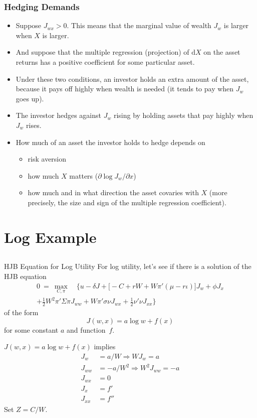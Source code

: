 \documentclass[10pt]{beamer}
\newcommand{\bi}{\begin{itemize}}
\newcommand{\ei}{\end{itemize}}
\newcommand{\im}{\item}
\newcommand{\D}{\mathrm{d}}
\newcommand{\bfr}{\begin{frame}}
\begin{document}
\bfr\frametitle{Hedging Demands}
\bi
\im Suppose $J_{wx}>0$.  This means that the marginal value of wealth $J_w$ is larger when $X$ is larger.
\im And suppose that the multiple regression (projection) of $\D X$ on the asset returns has a positive coefficient for some particular asset.  
\im Under these two conditions, an investor holds an extra amount of the asset, because it pays off highly when wealth is needed (it tends to pay when $J_w$ goes up).
\im The investor hedges against $J_w$ rising by holding assets that pay highly when $J_w$ rises.
\im How much of an asset the investor holds to hedge depends on
\bi
\im risk aversion
\im how much $X$ matters ($\partial \log J_w/\partial x$)
\im how much and in what direction the asset covaries with $X$ (more precisely, the size and sign of the multiple regression coefficient).
\ei
\ei
\end{frame}

\section{Log Example}\subsection{}


\begin{frame}{HJB Equation for Log Utility}
For log utility, let's see if there is a solution of the HJB equation 
\begin{multline*} 0 \ = \ \max_{C,\pi} \quad \bigg\{u - \delta J + \big[-C + rW + W\pi'(\mu - r\iota)\big]J_w + \phi J_x \\
+ \frac{1}{2}W^2\pi'\Sigma\pi J_{ww} + W\pi'\sigma\nu J_{wx} 
+ \frac{1}{2}\nu'\nu J_{xx} \bigg\}
\end{multline*}
of the form 
$$J(w,x) = a \log w + f(x)$$
for some constant $a$ and function~$f$.
\end{frame}

\begin{frame}

$J(w,x) = a \log w + f(x)$ implies
 \begin{align*}   
 J_w &=a/W \Rightarrow WJ_w = a\\
 J_{ww}&=-a/W^2 \Rightarrow W^2J_{ww}=-a\\
 J_{wx}&=0\\
 J_x&=f'\\ 
 J_{xx} &= f''
 \end{align*}
 Set $Z=C/W$.
\end{frame}
\end{document}

